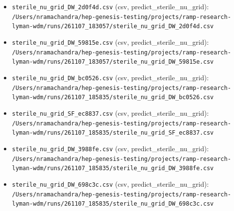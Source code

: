 \documentclass[11pt,a4paper]{article}
\begin{document}
\begin{itemize}
  \item \texttt{sterile\_\allowbreak{}nu\_\allowbreak{}grid\_\allowbreak{}DW\_\allowbreak{}2d0f4d.csv} (csv, predict\_sterile\_nu\_grid): \texttt{/\allowbreak{}Users/\allowbreak{}nramachandra/\allowbreak{}hep-genesis-testing/\allowbreak{}projects/\allowbreak{}ramp-research-lyman-wdm/\allowbreak{}runs/\allowbreak{}261107\_\allowbreak{}183057/\allowbreak{}sterile\_\allowbreak{}nu\_\allowbreak{}grid\_\allowbreak{}DW\_\allowbreak{}2d0f4d.csv}
  \item \texttt{sterile\_\allowbreak{}nu\_\allowbreak{}grid\_\allowbreak{}DW\_\allowbreak{}59815e.csv} (csv, predict\_sterile\_nu\_grid): \texttt{/\allowbreak{}Users/\allowbreak{}nramachandra/\allowbreak{}hep-genesis-testing/\allowbreak{}projects/\allowbreak{}ramp-research-lyman-wdm/\allowbreak{}runs/\allowbreak{}261107\_\allowbreak{}183057/\allowbreak{}sterile\_\allowbreak{}nu\_\allowbreak{}grid\_\allowbreak{}DW\_\allowbreak{}59815e.csv}
  \item \texttt{sterile\_\allowbreak{}nu\_\allowbreak{}grid\_\allowbreak{}DW\_\allowbreak{}bc0526.csv} (csv, predict\_sterile\_nu\_grid): \texttt{/\allowbreak{}Users/\allowbreak{}nramachandra/\allowbreak{}hep-genesis-testing/\allowbreak{}projects/\allowbreak{}ramp-research-lyman-wdm/\allowbreak{}runs/\allowbreak{}261107\_\allowbreak{}185835/\allowbreak{}sterile\_\allowbreak{}nu\_\allowbreak{}grid\_\allowbreak{}DW\_\allowbreak{}bc0526.csv}
  \item \texttt{sterile\_\allowbreak{}nu\_\allowbreak{}grid\_\allowbreak{}SF\_\allowbreak{}ec8837.csv} (csv, predict\_sterile\_nu\_grid): \texttt{/\allowbreak{}Users/\allowbreak{}nramachandra/\allowbreak{}hep-genesis-testing/\allowbreak{}projects/\allowbreak{}ramp-research-lyman-wdm/\allowbreak{}runs/\allowbreak{}261107\_\allowbreak{}185835/\allowbreak{}sterile\_\allowbreak{}nu\_\allowbreak{}grid\_\allowbreak{}SF\_\allowbreak{}ec8837.csv}
  \item \texttt{sterile\_\allowbreak{}nu\_\allowbreak{}grid\_\allowbreak{}DW\_\allowbreak{}3988fe.csv} (csv, predict\_sterile\_nu\_grid): \texttt{/\allowbreak{}Users/\allowbreak{}nramachandra/\allowbreak{}hep-genesis-testing/\allowbreak{}projects/\allowbreak{}ramp-research-lyman-wdm/\allowbreak{}runs/\allowbreak{}261107\_\allowbreak{}185835/\allowbreak{}sterile\_\allowbreak{}nu\_\allowbreak{}grid\_\allowbreak{}DW\_\allowbreak{}3988fe.csv}
  \item \texttt{sterile\_\allowbreak{}nu\_\allowbreak{}grid\_\allowbreak{}DW\_\allowbreak{}698c3c.csv} (csv, predict\_sterile\_nu\_grid): \texttt{/\allowbreak{}Users/\allowbreak{}nramachandra/\allowbreak{}hep-genesis-testing/\allowbreak{}projects/\allowbreak{}ramp-research-lyman-wdm/\allowbreak{}runs/\allowbreak{}261107\_\allowbreak{}185835/\allowbreak{}sterile\_\allowbreak{}nu\_\allowbreak{}grid\_\allowbreak{}DW\_\allowbreak{}698c3c.csv}
\end{itemize}
\end{document}
